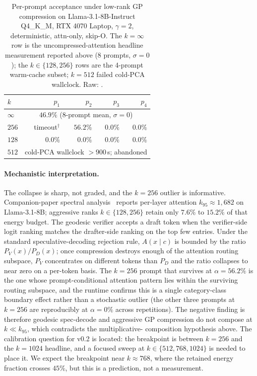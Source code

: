 \documentclass[11pt]{article}
\begin{document}
\begin{table}[h]\centering\small
\caption{Per-prompt acceptance under low-rank GP compression on
Llama-3.1-8B-Instruct Q4\_K\_M, RTX 4070 Laptop, $\gamma{=}2$,
deterministic, attn-only, skip-O. The $k{=}\infty$ row is the
uncompressed-attention headline measurement reported above
(8 prompts, $\sigma{=}0$); the $k{\in}\{128, 256\}$ rows are the
4-prompt warm-cache subset; $k{=}512$ failed cold-PCA wallclock.
Raw: \protect{}.}
\label{tab:accept-collapse}
\begin{tabular}{@{}lrrrr@{}}
\toprule
$k$ & $p_1$ & $p_2$ & $p_3$ & $p_4$ \\
\midrule
$\infty$ & \multicolumn{4}{c}{$46.9\%$ (8-prompt mean, $\sigma{=}0$)} \\
$256$ & timeout$^\dagger$ & $56.2\%$ & $0.0\%$ & $0.0\%$ \\
$128$ & $0.0\%$ & $0.0\%$ & $0.0\%$ & $0.0\%$ \\
$512$ & \multicolumn{4}{c}{cold-PCA wallclock $>900$\,s; abandoned} \\
\bottomrule
\end{tabular}
\end{table}

\paragraph{Mechanistic interpretation.} The collapse is sharp, not
graded, and the $k{=}256$ outlier is informative. Companion-paper
spectral analysis~\cite{stewart2026grc} reports per-layer attention
$k_{95}{\approx}1{,}682$ on Llama-3.1-8B; aggressive ranks
$k\in\{128, 256\}$ retain only $7.6$\% to $15.2$\% of that energy budget.
The geodesic verifier accepts a draft token when the verifier-side
logit ranking matches the drafter-side ranking on the top few entries.
Under the standard speculative-decoding rejection rule, $A(x{\mid}c)$ is bounded
by the ratio $P_V(x)/P_D(x)$; once compression destroys enough of the
attention routing subspace, $P_V$ concentrates on different tokens
than $P_D$ and the ratio collapses to near zero on a per-token basis.
The $k{=}256$ prompt that survives at $\alpha{=}56.2\%$ is the one
whose prompt-conditional attention pattern lies within the surviving
routing subspace, and the runtime confirms this is a single
category-class boundary effect rather than a stochastic outlier (the
other three prompts at $k{=}256$ are reproducibly at $\alpha{=}0\%$
across repetitions). The negative finding is therefore
geodesic spec-decode and aggressive GP compression do not
compose at $k\ll k_{95}$, which contradicts the multiplicative-
composition hypothesis above. The calibration question for v0.2 is
located: the breakpoint is between $k{=}256$ and the $k{=}1024$
headline, and a focused sweep at $k\in\{512, 768, 1024\}$ is needed
to place it. We expect the breakpoint near $k\approx 768$, where the
retained energy fraction crosses $45$\%, but this is a prediction,
not a measurement.
\end{document}
